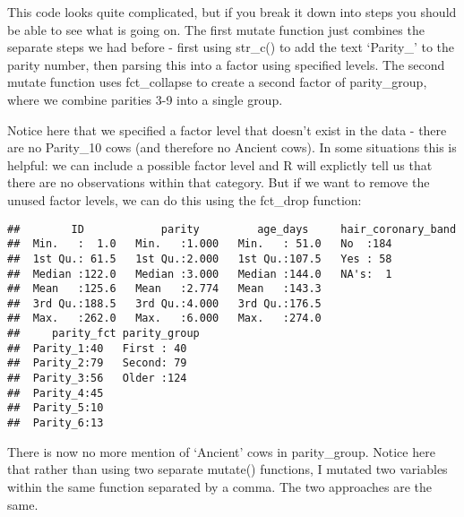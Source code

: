 \documentclass[
]{article}
\newenvironment{Shaded}{\begin{snugshade}}{\end{snugshade}}
\newcommand{\DataTypeTok}[1]{\textcolor[rgb]{0.13,0.29,0.53}{#1}}
\newcommand{\KeywordTok}[1]{\textcolor[rgb]{0.13,0.29,0.53}{\textbf{#1}}}
\newcommand{\NormalTok}[1]{#1}
\newcommand{\OperatorTok}[1]{\textcolor[rgb]{0.81,0.36,0.00}{\textbf{#1}}}
\newcommand{\StringTok}[1]{\textcolor[rgb]{0.31,0.60,0.02}{#1}}
\begin{document}
This code looks quite complicated, but if you break it down into steps
you should be able to see what is going on. The first mutate function
just combines the separate steps we had before - first using str\_c() to
add the text `Parity\_' to the parity number, then parsing this into a
factor using specified levels. The second mutate function uses
fct\_collapse to create a second factor of parity\_group, where we
combine parities 3-9 into a single group.

Notice here that we specified a factor level that doesn't exist in the
data - there are no Parity\_10 cows (and therefore no Ancient cows). In
some situations this is helpful: we can include a possible factor level
and R will explictly tell us that there are no observations within that
category. But if we want to remove the unused factor levels, we can do
this using the fct\_drop function:

\begin{Shaded}
\end{Shaded}

\begin{verbatim}
##        ID            parity         age_days     hair_coronary_band
##  Min.   :  1.0   Min.   :1.000   Min.   : 51.0   No  :184          
##  1st Qu.: 61.5   1st Qu.:2.000   1st Qu.:107.5   Yes : 58          
##  Median :122.0   Median :3.000   Median :144.0   NA's:  1          
##  Mean   :125.6   Mean   :2.774   Mean   :143.3                     
##  3rd Qu.:188.5   3rd Qu.:4.000   3rd Qu.:176.5                     
##  Max.   :262.0   Max.   :6.000   Max.   :274.0                     
##     parity_fct parity_group
##  Parity_1:40   First : 40  
##  Parity_2:79   Second: 79  
##  Parity_3:56   Older :124  
##  Parity_4:45               
##  Parity_5:10               
##  Parity_6:13
\end{verbatim}

There is now no more mention of `Ancient' cows in parity\_group. Notice
here that rather than using two separate mutate() functions, I mutated
two variables within the same function separated by a comma. The two
approaches are the same.
\end{document}
